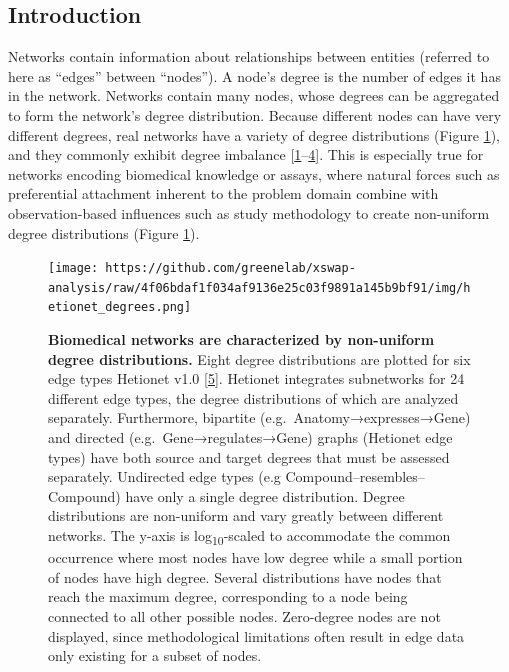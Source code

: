 \hypertarget{introduction}{%
\subsection{Introduction}\label{introduction}}

Networks contain information about relationships between entities (referred to here as ``edges'' between ``nodes'').
A node's degree is the number of edges it has in the network.
Networks contain many nodes, whose degrees can be aggregated to form the network's degree distribution.
Because different nodes can have very different degrees, real networks have a variety of degree distributions (Figure \ref{fig:hetionet}), and they commonly exhibit degree imbalance {[}\protect\hyperlink{ref-GFS9MouO}{1}--\protect\hyperlink{ref-rly3gDig}{4}{]}.
This is especially true for networks encoding biomedical knowledge or assays, where natural forces such as preferential attachment inherent to the problem domain combine with observation-based influences such as study methodology to create non-uniform degree distributions (Figure \ref{fig:hetionet}).

\begin{figure}
\hypertarget{fig:hetionet}{%
\centering
\texttt{[image: https://github.com/greenelab/xswap-analysis/raw/4f06bdaf1f034af9136e25c03f9891a145b9bf91/img/hetionet\_degrees.png]}
\caption{\textbf{Biomedical networks are characterized by non-uniform degree distributions.}
Eight degree distributions are plotted for six edge types Hetionet v1.0 {[}\protect\hyperlink{ref-O21tn8vf}{5}{]}.
Hetionet integrates subnetworks for 24 different edge types, the degree distributions of which are analyzed separately.
Furthermore, bipartite (e.g.~Anatomy→expresses→Gene) and directed (e.g.~Gene→regulates→Gene) graphs (Hetionet edge types) have both source and target degrees that must be assessed separately.
Undirected edge types (e.g Compound--resembles--Compound) have only a single degree distribution.
Degree distributions are non-uniform and vary greatly between different networks.
The y-axis is log\textsubscript{10}-scaled to accommodate the common occurrence where most nodes have low degree while a small portion of nodes have high degree.
Several distributions have nodes that reach the maximum degree, corresponding to a node being connected to all other possible nodes.
Zero-degree nodes are not displayed, since methodological limitations often result in edge data only existing for a subset of nodes.}\label{fig:hetionet}
}
\end{figure}

